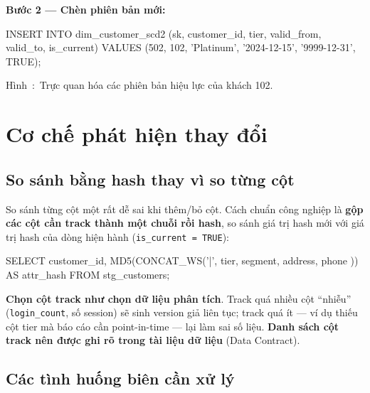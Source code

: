 \documentclass[12pt]{article}
\newcounter{hinh}
\newcommand{\capfig}[1]{%
  \refstepcounter{hinh}%
    Hình~\thehinh:~#1
}
\begin{document}
\noindent
\textbf{Bước 2 --- Chèn phiên bản mới:}

\begin{aivnsqlbox}
INSERT INTO dim_customer_scd2
    (sk, customer_id, tier, valid_from, valid_to, is_current)
VALUES
    (502, 102, 'Platinum', '2024-12-15', '9999-12-31', TRUE);
\end{aivnsqlbox}



\begin{figurecaptionmodern}
\capfig{Trực quan hóa các phiên bản hiệu lực của khách 102.}
\end{figurecaptionmodern}

\section{Cơ chế phát hiện thay đổi}

\subsection{So sánh bằng hash thay vì so từng cột}

So sánh từng cột một rất dễ sai khi thêm/bỏ cột. Cách chuẩn công nghiệp là \textbf{gộp các cột cần track thành một chuỗi rồi hash}, so sánh giá trị hash mới với giá trị hash của dòng hiện hành (\texttt{is\_current = TRUE}):

\begin{aivnsqlbox}
SELECT
    customer_id,
    MD5(CONCAT_WS('|',
        tier,
        segment,
        address,
        phone
    )) AS attr_hash
FROM stg_customers;
\end{aivnsqlbox}

\begin{notebox}
\textbf{Chọn cột track như chọn dữ liệu phân tích}. Track quá nhiều cột ``nhiễu'' (\texttt{login\_count}, số session) sẽ sinh version giả liên tục; track quá ít --- ví dụ thiếu cột tier mà báo cáo cần point-in-time --- lại làm sai số liệu. \textbf{Danh sách cột track nên được ghi rõ trong tài liệu dữ liệu} (Data Contract).
\end{notebox}

\subsection{Các tình huống biên cần xử lý}
\end{document}
